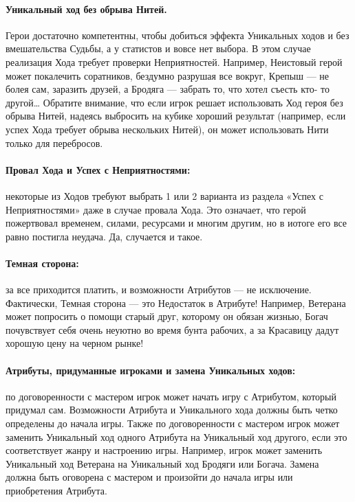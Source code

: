 \paragraph{Уникальный ход без обрыва Нитей.} Герои достаточно компетентны, чтобы добиться эффекта Уникальных ходов и без вмешательства Судьбы, а у статистов и вовсе нет выбора. В этом случае реализация Хода требует проверки Неприятностей. Например, Неистовый герой может покалечить соратников, бездумно разрушая все вокруг, Крепыш — не болея сам, заразить друзей, а Бродяга — забрать то, что хотел съесть кто- то другой…
\newline
Обратите внимание, что если игрок решает использовать Ход героя без обрыва Нитей, надеясь выбросить на кубике хороший результат (например, если успех Хода требует обрыва нескольких Нитей), он может использовать Нити только для перебросов.
\paragraph{Провал Хода и Успех с Неприятностями:} некоторые из Ходов требуют выбрать 1 или 2 варианта из раздела «Успех с Неприятностями» даже в случае провала Хода. Это означает, что герой пожертвовал временем, силами, ресурсами и многим другим, но в иотоге его все равно постигла неудача. Да, случается и такое. 
\paragraph{Темная сторона:} за все приходится платить, и возможности Атрибутов — не исключение. Фактически, Темная сторона — это Недостаток в Атрибуте! Например, Ветерана может попросить о помощи старый друг, которому он обязан жизнью, Богач почувствует себя очень неуютно во время бунта рабочих, а за Красавицу дадут хорошую цену на черном рынке!
\paragraph{Атрибуты, придуманные игроками и замена Уникальных ходов:} по договоренности с мастером игрок может начать игру с Атрибутом, который придумал сам. Возможности Атрибута и Уникального хода должны быть четко определены до начала игры. Также по договоренности с мастером игрок может заменить Уникальный ход одного Атрибута на Уникальный ход другого, если это соответствует жанру и настроению игры. Например, игрок может заменить Уникальный ход Ветерана на Уникальный ход Бродяги или Богача. Замена должна быть оговорена с мастером и произойти до начала игры или приобретения Атрибута.
